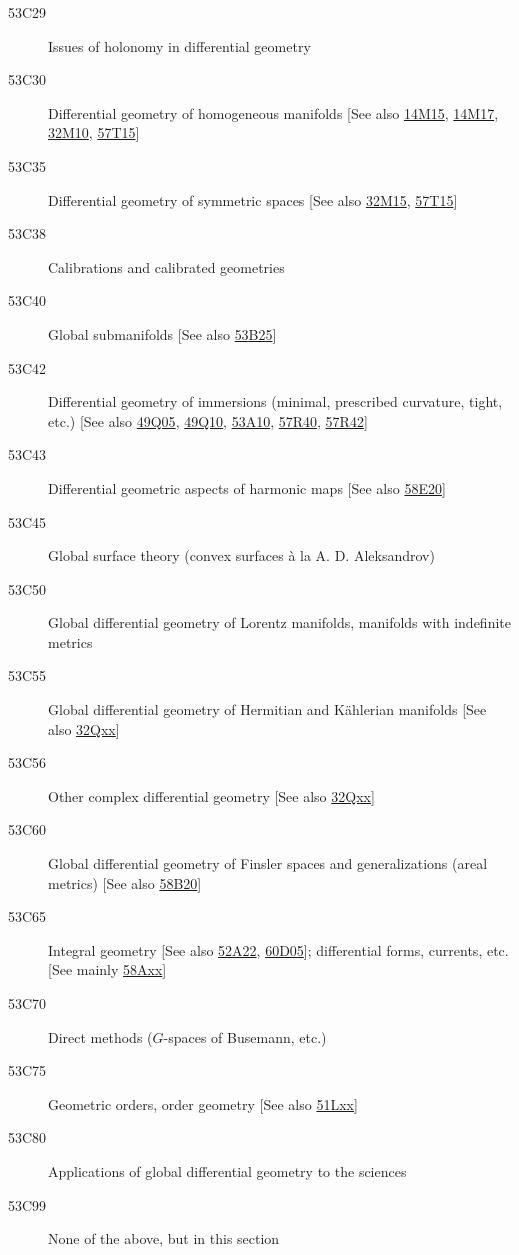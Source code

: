 \documentclass[letterpaper]{article}
\begin{document}
\begin{description}
\item [53C29]\label{53C29} Issues of holonomy in differential geometry 
\item [53C30]\label{53C30} Differential geometry of homogeneous manifolds [See also \hyperref[14M15]{14M15}, \hyperref[14M17]{14M17}, \hyperref[32M10]{32M10}, \hyperref[57T15]{57T15}]
\item [53C35]\label{53C35} Differential geometry of symmetric spaces [See also \hyperref[32M15]{32M15}, \hyperref[57T15]{57T15}]
\item [53C38]\label{53C38} Calibrations and calibrated geometries
\item [53C40]\label{53C40} Global submanifolds [See also \hyperref[53B25]{53B25}]
\item [53C42]\label{53C42} Differential geometry of immersions (minimal, prescribed curvature, tight, etc.) [See also \hyperref[49Q05]{49Q05}, \hyperref[49Q10]{49Q10}, \hyperref[53A10]{53A10}, \hyperref[57R40]{57R40}, \hyperref[57R42]{57R42}]
\item [53C43]\label{53C43} Differential geometric aspects of harmonic maps [See also \hyperref[58E20]{58E20}]
\item [53C45]\label{53C45} Global surface theory (convex surfaces \`{a} la A. D. Aleksandrov)
\item [53C50]\label{53C50} Global differential geometry of Lorentz manifolds, manifolds with indefinite metrics
\item [53C55]\label{53C55} Global differential geometry of Hermitian and K\"{a}hlerian manifolds [See also \hyperref[32Qxx]{32Qxx}]
\item [53C56]\label{53C56} Other complex differential geometry [See also \hyperref[32Qxx]{32Qxx}]
\item [53C60]\label{53C60} Global differential geometry of Finsler spaces and generalizations (areal metrics) [See also \hyperref[58B20]{58B20}]
\item [53C65]\label{53C65} Integral geometry [See also \hyperref[52A22]{52A22}, \hyperref[60D05]{60D05}]; differential forms, currents, etc. [See mainly \hyperref[58Axx]{58Axx}]
\item [53C70]\label{53C70} Direct methods ($G$-spaces of Busemann, etc.)
\item [53C75]\label{53C75} Geometric orders, order geometry [See also \hyperref[51Lxx]{51Lxx}]
\item [53C80]\label{53C80} Applications of global differential geometry to the sciences
\item [53C99]\label{53C99} None of the above, but in this section
\end{description}
\end{document}
